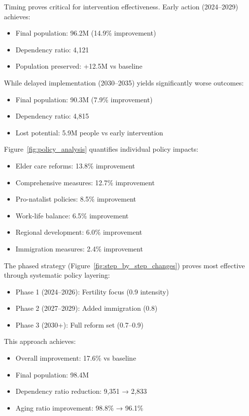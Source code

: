 \documentclass{article} %
\begin{document}
Timing proves critical for intervention effectiveness. Early action (2024--2029) achieves:
\begin{itemize}
    \item Final population: 96.2M (14.9\% improvement)
    \item Dependency ratio: 4,121
    \item Population preserved: +12.5M vs baseline
\end{itemize}

While delayed implementation (2030--2035) yields significantly worse outcomes:
\begin{itemize}
    \item Final population: 90.3M (7.9\% improvement)
    \item Dependency ratio: 4,815
    \item Lost potential: 5.9M people vs early intervention
\end{itemize}

Figure~\ref{fig:policy_analysis} quantifies individual policy impacts:
\begin{itemize}
    \item Elder care reforms: 13.8\% improvement
    \item Comprehensive measures: 12.7\% improvement
    \item Pro-natalist policies: 8.5\% improvement
    \item Work-life balance: 6.5\% improvement
    \item Regional development: 6.0\% improvement
    \item Immigration measures: 2.4\% improvement
\end{itemize}

The phased strategy (Figure~\ref{fig:step_by_step_changes}) proves most effective through systematic policy layering:
\begin{itemize}
    \item Phase 1 (2024--2026): Fertility focus (0.9 intensity)
    \item Phase 2 (2027--2029): Added immigration (0.8)
    \item Phase 3 (2030+): Full reform set (0.7--0.9)
\end{itemize}

This approach achieves:
\begin{itemize}
    \item Overall improvement: 17.6\% vs baseline
    \item Final population: 98.4M
    \item Dependency ratio reduction: 9,351 → 2,833
    \item Aging ratio improvement: 98.8\% → 96.1\%
\end{itemize}
\end{document}
